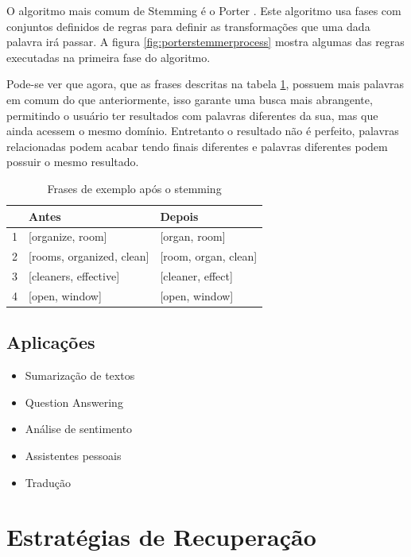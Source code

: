 O algoritmo mais comum de Stemming é o Porter \cite{porterstemming}. Este algoritmo usa fases com conjuntos definidos de regras para definir as transformações que uma dada palavra irá passar. A figura \ref{fig:porterstemmerprocess} mostra algumas das regras executadas na primeira fase do algoritmo.

Pode-se ver que agora, que as frases descritas na tabela \ref{tab:tokenfilter}, possuem mais palavras em comum do que anteriormente, isso garante uma busca mais abrangente, permitindo o usuário ter resultados com palavras diferentes da sua, mas que ainda acessem o mesmo domínio. Entretanto o resultado não é perfeito, palavras relacionadas podem acabar tendo finais diferentes e palavras diferentes podem possuir o mesmo resultado.
\begin{table}[htb]
	\centering
    \def\arraystretch{1.2}
    \begin{tabular}{|l|l|l|}
        \hline
        & \textbf{Antes} & \textbf{Depois} \\ \hline
        1 & [organize, room]  & [organ, room]            \\ \hline
        2 & [rooms, organized, clean]  & [room, organ, clean] \\ \hline
        3 & [cleaners, effective]  & [cleaner, effect]                              \\ \hline
        4 & [open, window]  & [open, window]                             \\ \hline
    \end{tabular}
	\caption{Frases de exemplo após o stemming}
    \label{tab:tokenfilter}
\end{table}

\subsection{Aplicações}
\begin{itemize}
    \item Sumarização de textos
    \item Question Answering
    \item Análise de sentimento
    \item Assistentes pessoais
    \item Tradução
\end{itemize}

\section{Estratégias de Recuperação}

